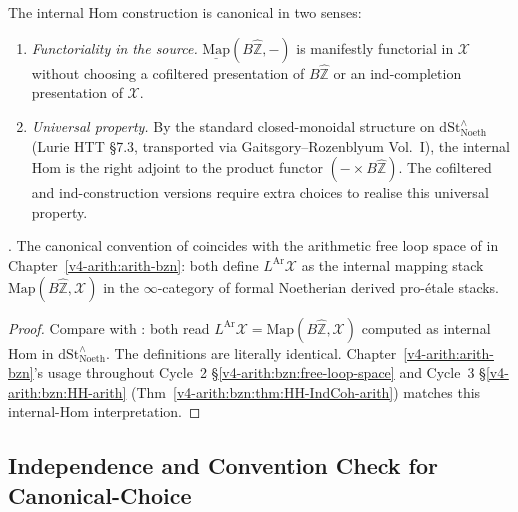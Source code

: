 \begin{remark}
\label{v4-arith:bzn-rcompletion:rem:why-intHom}
The internal Hom construction is canonical in two senses:
\begin{enumerate}
\item \emph{Functoriality in the source.} \(\underline{\mathrm{Map}}(B\widehat{\mathbb{Z}},-)\)
is manifestly functorial in \(\mathcal{X}\) without choosing a
cofiltered presentation of \(B\widehat{\mathbb{Z}}\) or an
ind-completion presentation of \(\mathcal{X}\).
\item \emph{Universal property.} By the standard closed-monoidal
structure on \(\mathrm{dSt}^{\wedge}_{\mathrm{Noeth}}\) (Lurie HTT
\S 7.3, transported via Gaitsgory--Rozenblyum Vol.~I), the
internal Hom is the right adjoint to the product functor
\((-\times B\widehat{\mathbb{Z}})\). The cofiltered and
ind-construction versions require extra choices to realise this
universal property.
\end{enumerate}
\end{remark}

\begin{proposition}
\label{v4-arith:bzn-rcompletion:prop:R3-matches-ch28}
\ClaimStatusProvedHere. The canonical convention of
 coincides with
the arithmetic free loop space of
 in
Chapter~\ref{v4-arith:arith-bzn}: both define \(L^{\mathrm{Ar}}\mathcal{X}\)
as the internal mapping stack
\(\mathrm{Map}(B\widehat{\mathbb{Z}},\mathcal{X})\) in the
\(\infty\)-category of formal Noetherian derived pro-\'etale
stacks.
\end{proposition}

\begin{proof}
Compare  with
: both read
\(L^{\mathrm{Ar}}\mathcal{X}=\mathrm{Map}(B\widehat{\mathbb{Z}},\mathcal{X})\)
computed as internal Hom in
\(\mathrm{dSt}^{\wedge}_{\mathrm{Noeth}}\). The definitions are
literally identical. Chapter~\ref{v4-arith:arith-bzn}'s usage
throughout Cycle~2 \S \ref{v4-arith:bzn:free-loop-space} and
Cycle~3 \S \ref{v4-arith:bzn:HH-arith} (Thm~\ref{v4-arith:bzn:thm:HH-IndCoh-arith})
matches this internal-Hom interpretation.
\end{proof}

\subsection{Independence and Convention Check for Canonical-Choice}

